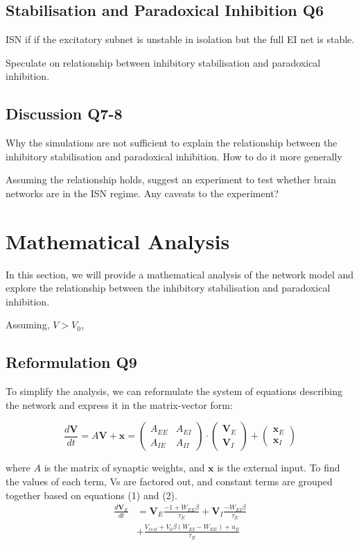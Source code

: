 \documentclass[10pt,twocolumn]{article}
\begin{document}
\subsection{Stabilisation and Paradoxical Inhibition Q6}
ISN if if the excitatory subnet is unstable in isolation
but the full EI net is stable.

Speculate on relationship between inhibitory stabilisation
and paradoxical inhibition.

\subsection{Discussion Q7-8}
Why the simulations are not sufficient to explain
the relationship between the inhibitory stabilisation
and paradoxical inhibition. How to do it more generally

Assuming the relationship holds, suggest an experiment
to test whether brain networks are in the ISN regime.
Any caveats to the experiment?

\section{Mathematical Analysis}
In this section, we will provide a mathematical analysis
of the network model and explore the relationship between
the inhibitory stabilisation and paradoxical inhibition.

Assuming, $V > V_0$,

\subsection{Reformulation Q9}
To simplify the analysis, we can reformulate the system
of equations describing the network and
express it in the matrix-vector form:

$$
    \frac{d\textbf{V}}{dt}
    = A\textbf{V} + \textbf{x}
    =
    \begin{pmatrix}
        A_{EE} & A_{EI} \\
        A_{IE} & A_{II}
    \end{pmatrix}
    \cdot \begin{pmatrix} \textbf{V}_E \\ \textbf{V}_I \end{pmatrix}
    + \begin{pmatrix} \textbf{x}_E \\ \textbf{x}_I \end{pmatrix}
$$

where $A$ is the matrix of synaptic weights,
and $\textbf{x}$ is the external input.
To find the values of each term, Vs are factored out, and
constant terms are grouped together based on equations (1) and (2).
$$
\begin{align*}
    \frac{d\textbf{V}_E}{dt} &= \textbf{V}_E \boxed{\frac{-1 + W_{EE}\beta}{\tau_E}}
    + \textbf{V}_I \boxed{\frac{-W_{EI}\beta}{\tau_E}} \\
    &+ \boxed{\frac{V_{rest} + V_0\beta(W_{EI}-W_{EE}) + u_E}{\tau_E}}
\end{align*}
$$
\end{document}
